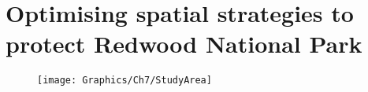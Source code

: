 %
\chapter{Optimising spatial strategies to protect Redwood National Park\label{ch:redwood}}

\begin{figure}
    \begin{center}
        \texttt{[image: Graphics/Ch7/StudyArea]}
        \caption[]{}
    \end{center}
\end{figure}

